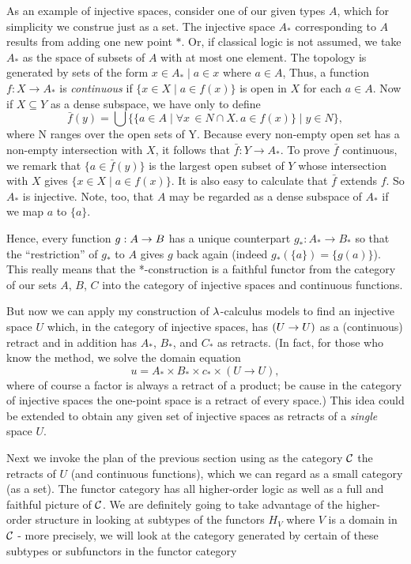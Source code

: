 As an example of injective spaces, consider one of our giv­en types $A$, which for simplicity we construe just as a set.
The injective space $A_*$ corresponding to $A$ results from adding one new point $*$. Or, if classical logic is not assumed, we take $A_*$ as the space of subsets of $A$ with at most one element. The topology is generated by sets of the form ${x \in A_* \mid  a \in x}$ where $a \in A$,	Thus, a function $f : X \to A_*$ is {\it continuous} if $\{x \in X \mid a \in f(x)\}$ is open in $X$ for each $a \in A$. Now if $X \subseteq Y$ as a dense subspace, we have only to define
$$
\bar{f}(y) = \bigcup \bigl\{\{a \in A \mid \forall x\, \in N \cap X.\, a \in f(x)\} \mid y \in N\bigr \},
$$
where N ranges over the open sets of Y. Because every non-emp­ty open set has a non-empty intersection with $X$, it follows that
$\bar{f} : Y \to A_*$. To prove $\bar{f}$ continuous, we remark that $\{a \in \bar{f}(y)\}$ is the largest open subset of $Y$ whose intersection with $X$ gives $\{x \in X \mid a \in f(x)\}$. It is also easy to
calculate that $\bar{f}$ extends $f$. So $A_*$ is injective. Note, too, that $A$ may be regarded as a dense subspace of $A_*$ if we map $a$ to $\{a\}$.

Hence, every function $g:A \rightarrow B$ has a unique counterpart $g_* : A_*\to B_*$ so that the ``restriction'' of $g_*$ to $A$ gives $g$ back again (indeed $g_*(\{a\}) = \{g(a)\}$). This really means that the *-construction is a faithful functor from the category of our sets $A$, $B$, $C$ into the category of injective spaces and contin­uous functions.

But now we can apply my construction of $\lambda$-calculus models to find an injective space $U$ which, in the category of injective spaces, has $(U\rightarrow U)$ as a (continuous) retract and in addition has $A_*$, $B_*$, and $C_*$ as retracts. (In fact, for those who know the method, we solve the domain equation
$$
u = A_* \times B_* \times c_* \times (U \to U),
$$
where of course a factor is always a retract of a product; be­ cause in the category of injective spaces the one-point space is a retract of every space.) This idea could be extended to obtain any given set of injective spaces as retracts of a {\it single} space $U$.

Next we invoke the plan of the previous section using as the category $\mathcal C$ the retracts of $U$ (and continuous functions), which we can regard as a small category (as a set). The functor cat­egory has all higher-order logic as well as a full and faith­ful picture of $\mathcal C$. We are definitely going to take advantage of the higher-order structure in looking at subtypes of the functors $H_V$ where $V$ is a domain in $\mathcal C$ - more precisely, we will look at the category generated by certain of these subtypes or
subfunctors in the functor category

